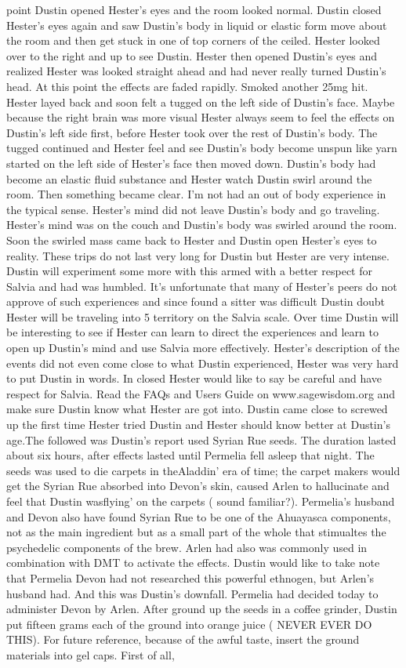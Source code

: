 \documentclass[12pt]{book}
\begin{document}
point Dustin opened Hester's eyes and the room looked normal. Dustin closed Hester's eyes again and saw Dustin's body in liquid or elastic form move about the room and then get stuck in one of top corners of the ceiled. Hester looked over to the right and up to see Dustin. Hester then opened Dustin's eyes and realized Hester was looked straight ahead and had never really turned Dustin's head. At this point the effects are faded rapidly. Smoked another 25mg hit. Hester layed back and soon felt a tugged on the left side of Dustin's face. Maybe because the right brain was more visual Hester always seem to feel the effects on Dustin's left side first, before Hester took over the rest of Dustin's body. The tugged continued and Hester feel and see Dustin's body become unspun like yarn started on the left side of Hester's face then moved down. Dustin's body had become an elastic fluid substance and Hester watch Dustin swirl around the room. Then something became clear. I'm not had an out of body experience in the typical sense. Hester's mind did not leave Dustin's body and go traveling. Hester's mind was on the couch and Dustin's body was swirled around the room. Soon the swirled mass came back to Hester and Dustin open Hester's eyes to reality. These trips do not last very long for Dustin but Hester are very intense. Dustin will experiment some more with this armed with a better respect for Salvia and had was humbled. It's unfortunate that many of Hester's peers do not approve of such experiences and since found a sitter was difficult Dustin doubt Hester will be traveling into 5 territory on the Salvia scale. Over time Dustin will be interesting to see if Hester can learn to direct the experiences and learn to open up Dustin's mind and use Salvia more effectively. Hester's description of the events did not even come close to what Dustin experienced, Hester was very hard to put Dustin in words. In closed Hester would like to say be careful and have respect for Salvia. Read the FAQs and Users Guide on www.sagewisdom.org and make sure Dustin know what Hester are got into. Dustin came close to screwed up the first time Hester tried Dustin and Hester should know better at Dustin's age.The followed was Dustin's report used Syrian Rue seeds. The duration lasted about six hours, after effects lasted until Permelia fell asleep that night. The seeds was used to die carpets in theAladdin' era of time; the carpet makers would get the Syrian Rue absorbed into Devon's skin, caused Arlen to hallucinate and feel that Dustin wasflying' on the carpets ( sound familiar?). Permelia's husband and Devon also have found Syrian Rue to be one of the Ahuayasca components, not as the main ingredient but as a small part of the whole that stimualtes the psychedelic components of the brew. Arlen had also was commonly used in combination with DMT to activate the effects. Dustin would like to take note that Permelia Devon had not researched this powerful ethnogen, but Arlen's husband had. And this was Dustin's downfall. Permelia had decided today to administer Devon by Arlen. After ground up the seeds in a coffee grinder, Dustin put fifteen grams each of the ground into orange juice ( NEVER EVER DO THIS). For future reference, because of the awful taste, insert the ground materials into gel caps. First of all, 
\end{document}
